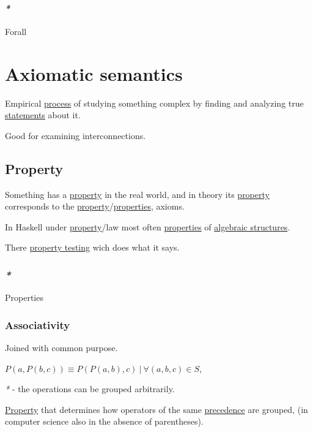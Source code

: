 \documentclass[a4paper,14pt,oneside]{book}
\begin{document}
\paragraph{\emph{*}}
\label{sec:orgd8464b2}

\label{org1835a02}Forall

\section{\label{orgb18776e}Axiomatic semantics}
\label{sec:org32fef01}
Empirical \hyperref[orgdfacdd2]{process} of studying something complex by finding and analyzing true \hyperref[org006718c]{statements} about it.

Good for examining interconnections.

\subsection{\label{org61434c5}Property}
\label{sec:org7caa538}
Something has a \hyperref[org61434c5]{property} in the real world, and in theory its \hyperref[org61434c5]{property} corresponds to the \hyperref[org61434c5]{property}/\hyperref[org7fe96da]{properties}, axioms.

In Haskell under \hyperref[org61434c5]{property}/law most often \hyperref[org7fe96da]{properties} of \hyperref[orgf6a2898]{algebraic structures}.

There \hyperref[org9b836a7]{property testing} wich does what it says.

\subsubsection{\emph{*}}
\label{sec:orgf354945}

\label{org7fe96da}Properties

\subsubsection{\label{orgc6433b8}Associativity}
\label{sec:orgc81ce43}
Joined with common purpose.

\(P(a,P(b,c)) \equiv P(P(a,b),c) \ | \ \forall (a,b,c) \in S\),

\emph{*} - the operations can be grouped arbitrarily.

\hyperref[org61434c5]{Property} that determines how operators of the same \hyperref[org5b4937a]{precedence} are grouped, (in computer science also in the absence of parentheses).
\end{document}
